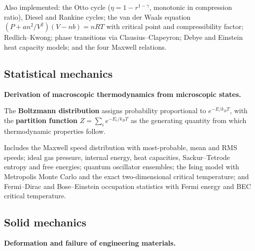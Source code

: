 \documentclass[11pt,a4paper]{article}
\begin{document}
Also implemented: the Otto cycle ($\eta = 1 - r^{1-\gamma}$, monotonic in compression ratio), Diesel
and Rankine cycles; the van der Waals equation
$\left(P + an^2/V^2\right)(V - nb) = nRT$ with critical point and compressibility factor;
Redlich--Kwong; phase transitions via Clausius--Clapeyron; Debye and Einstein heat capacity models;
and the four Maxwell relations.

\subsection{Statistical mechanics}

\textbf{Derivation of macroscopic thermodynamics from microscopic states.}

The \textbf{Boltzmann distribution} assigns probability proportional to $e^{-E/k_B T}$, with the
\textbf{partition function} $Z = \sum_i e^{-E_i/k_B T}$ as the generating quantity from which
thermodynamic properties follow.

Includes the Maxwell speed distribution with most-probable, mean and RMS speeds; ideal gas pressure,
internal energy, heat capacities, Sackur--Tetrode entropy and free energies; quantum oscillator
ensembles; the Ising model with Metropolis Monte Carlo and the exact two-dimensional critical
temperature; and Fermi--Dirac and Bose--Einstein occupation statistics with Fermi energy and BEC
critical temperature.

\subsection{Solid mechanics}

\textbf{Deformation and failure of engineering materials.}
\end{document}
